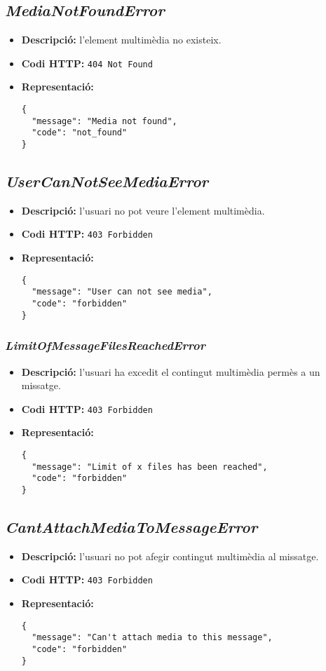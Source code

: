 \subsection{\emph{MediaNotFoundError}}
\begin{itemize}
	\item \textbf{Descripció:} l'element multimèdia no existeix.
	\item \textbf{Codi \ac{HTTP}:} \texttt{404 Not Found}
	\item \textbf{Representació:}
\begin{verbatim}
{
  "message": "Media not found",
  "code": "not_found"
}
\end{verbatim}
\end{itemize}
\subsection{\emph{UserCanNotSeeMediaError}}
\begin{itemize}
	\item \textbf{Descripció:} l'usuari no pot veure l'element multimèdia.
	\item \textbf{Codi \ac{HTTP}:} \texttt{403 Forbidden}
	\item \textbf{Representació:}
\begin{verbatim}
{
  "message": "User can not see media",
  "code": "forbidden"
}
\end{verbatim}
\end{itemize}
\subsubsection{\emph{LimitOfMessageFilesReachedError}}
\begin{itemize}
	\item \textbf{Descripció:} l'usuari ha excedit el contingut multimèdia permès a un missatge.
	\item \textbf{Codi \ac{HTTP}:} \texttt{403 Forbidden}
	\item \textbf{Representació:}
\begin{verbatim}
{
  "message": "Limit of x files has been reached",
  "code": "forbidden"
}
\end{verbatim}
\end{itemize}

\subsection{\emph{CantAttachMediaToMessageError}}
\begin{itemize}
	\item \textbf{Descripció:} l'usuari no pot afegir contingut multimèdia al missatge.
	\item \textbf{Codi \ac{HTTP}:} \texttt{403 Forbidden}
	\item \textbf{Representació:}
\begin{verbatim}
{
  "message": "Can't attach media to this message",
  "code": "forbidden"
}
\end{verbatim}
\end{itemize}
